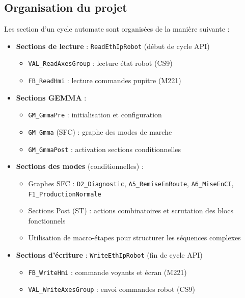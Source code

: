 \subsection{Organisation du projet}

Les section d'un cycle automate sont organisées de la manière suivante :

\begin{itemize}
    \item \textbf{Sections de lecture} : \texttt{ReadEthIpRobot} (début de cycle API)
    \begin{itemize}
        \item \texttt{VAL\_ReadAxesGroup} : lecture état robot (CS9)
        \item \texttt{FB\_ReadHmi} : lecture commandes pupitre (M221)
    \end{itemize}
    \item \textbf{Sections GEMMA} :
    \begin{itemize}
        \item \texttt{GM\_GmmaPre} : initialisation et configuration
        \item \texttt{GM\_Gmma} (SFC) : graphe des modes de marche
        \item \texttt{GM\_GmmaPost} : activation sections conditionnelles
    \end{itemize}
    \item \textbf{Sections des modes} (conditionnelles) :
    \begin{itemize}
        \item Graphes SFC : \texttt{D2\_Diagnostic}, \texttt{A5\_RemiseEnRoute}, \texttt{A6\_MiseEnCI}, \texttt{F1\_ProductionNormale}
        \item Sections Post (ST) : actions combinatoires et scrutation des blocs fonctionnels
        \item Utilisation de macro-étapes pour structurer les séquences complexes
    \end{itemize}
    \item \textbf{Sections d'écriture} : \texttt{WriteEthIpRobot} (fin de cycle API)
    \begin{itemize}
        \item \texttt{FB\_WriteHmi} : commande voyants et écran (M221)
        \item \texttt{VAL\_WriteAxesGroup} : envoi commandes robot (CS9)
    \end{itemize}
\end{itemize}
